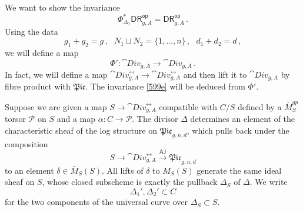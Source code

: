 \documentclass[a4paper,12pt]{article} %
\newcommand{\ca}[1]{{\mathcal{#1}}}
\theoremstyle{definition}
\theoremstyle{plain}%
\newcommand{\aj}{{\scriptstyle \mathsf{AJ}}}
\newcommand{\Picabs}{\mathfrak{Pic}}
\newcommand{\jocomment}[1]{}
\begin{document}

We want to show the invariance 
\begin{equation}\label{599e}
\Phi_{\Delta_1}^* \mathsf{DR}^{\mathsf{op}}_{g,A} = \mathsf{DR}^{\mathsf{op}}_{g,A}\, .
\end{equation}
Using the data 
\begin{equation*}
g_1+g_2=g\, , \ \ \ N_1\sqcup N_2 = \{1,\ldots,n\}\,, \ \ \ d_1+d_2=d\, ,
\end{equation*}
we will define a map $$\Phi'\colon\cat{Div}_{g,A}\to\cat{Div}_{g,A}\, .$$
In fact, we will define a map $\cat{Div}^{\rel}_{g,A}\to\cat{Div}^{\rel}_{g,A}$ and then lift it to $\cat{Div}_{g,A}$ by fibre product with $\Picabs$. 
The invariance \eqref{599e} will be deduced from $\Phi'$.

Suppose we are given a map $S \to \cat{Div}^{\rel}_{g,A}$ compatible with $C/S$ defined by a $\bar M_S^{gp}$ torsor $\ca P$ on $S$ and a map $\alpha\colon C \to \ca P$. 
The divisor $\Delta$ determines an element of the characteristic sheaf of the log structure on $\Picabs_{g,n,d}$, which pulls back under the composition $$S \to \cat{Div}^{\rel}_{g,A} \xrightarrow{\aj} \Picabs_{g,n,d}$$
to an element $\delta \in \bar M_S(S)$. All lifts of $\delta$ to $M_S(S)$ generate the same ideal sheaf on $S$, whose closed subscheme is exactly the pullback $\Delta_S$ of $\Delta$.
We write $$\Delta_1', \Delta_2' \subset C$$ for the two components of the universal curve over $\Delta_S \subset S$.


\end{document}
